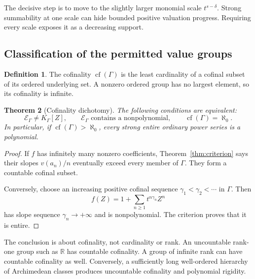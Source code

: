 \documentclass[11pt,letterpaper]{article}
\numberwithin{equation}{section}
\newtheorem{theorem}{Theorem}[section]
\theoremstyle{definition}
\newtheorem{definition}[theorem]{Definition}
\theoremstyle{remark}
\newcommand{\R}{\mathbb R}
\newcommand{\cf}{\operatorname{cf}}
\begin{document}
The decisive step is to move to the slightly larger monomial scale
$t^{s-\delta}$. Strong summability at one scale can hide bounded positive
valuation progress. Requiring every scale exposes it as a decreasing support.

\subsection{Classification of the permitted value groups}
\begin{definition}
The cofinality $\cf(\Gamma)$ is the least cardinality of a cofinal subset of
its ordered underlying set. A nonzero ordered group has no largest element,
so its cofinality is infinite.
\end{definition}

\begin{theorem}[Cofinality dichotomy]\label{thm:cofinality}
The following conditions are equivalent:
\[
 \mathcal E_\Gamma\ne K_\Gamma[Z],
 \qquad \mathcal E_\Gamma\text{ contains a nonpolynomial},
 \qquad \cf(\Gamma)=\aleph_0.
\]
In particular, if $\cf(\Gamma)>\aleph_0$, every strong entire ordinary power
series is a polynomial.
\end{theorem}
\begin{proof}
If $f$ has infinitely many nonzero coefficients, Theorem~\ref{thm:criterion}
says their slopes $v(a_n)/n$ eventually exceed every member of $\Gamma$.
They form a countable cofinal subset.

Conversely, choose an increasing positive cofinal sequence
$\gamma_1<\gamma_2<\cdots$ in $\Gamma$. Then
\begin{equation}\label{eq:constructed-entire}
 f(Z)=1+\sum_{n\ge1}t^{n\gamma_n}Z^n
\end{equation}
has slope sequence $\gamma_n\to+\infty$ and is nonpolynomial. The criterion
proves that it is entire.
\end{proof}

The conclusion is about cofinality, not cardinality or rank. An uncountable
rank-one group such as $\R$ has countable cofinality. A group of infinite rank
can have countable cofinality as well. Conversely, a sufficiently long
well-ordered hierarchy of Archimedean classes produces uncountable
cofinality and polynomial rigidity.
\end{document}
